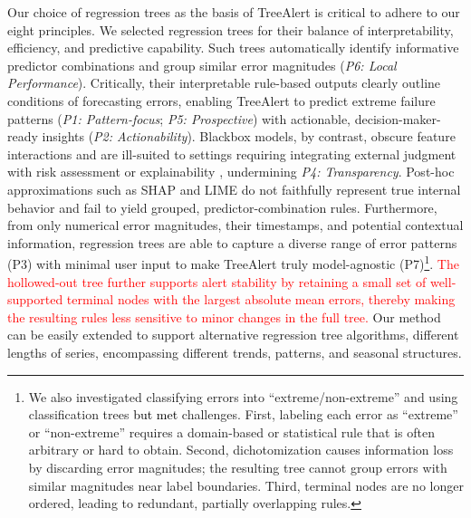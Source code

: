 \documentclass[]{interact}
\newcommand{\galit}[1]{\textcolor{black}{#1}}
\newcommand{\matt}[1]{\textcolor{red}{#1}}
\theoremstyle{definition}
\begin{document}
Our %
choice of regression trees as the basis of TreeAlert is %
critical to adhere to our eight principles. %
We selected regression trees for their balance of interpretability, efficiency, and predictive capability. Such trees automatically identify informative predictor combinations and group similar error magnitudes (\emph{P6: Local Performance}). Critically, their interpretable rule-based outputs clearly outline conditions %
of forecasting errors, %
enabling TreeAlert to predict extreme failure patterns (\emph{P1: Pattern-focus}; \emph{P5: Prospective}) with actionable, decision-maker-ready insights (\emph{P2: Actionability}). Blackbox models, by contrast, obscure feature interactions %
and are ill-suited to settings requiring integrating external judgment with risk assessment or explainability \citep{rudin2019, houssainy2021}, undermining \emph{P4: Transparency}. Post-hoc approximations such as SHAP and LIME do not faithfully represent true internal behavior \citep{rudin2019} and fail to yield grouped, predictor-combination rules. Furthermore, from only numerical error magnitudes, their timestamps, and potential contextual information, regression trees are able to capture a diverse range of error patterns (P3) with minimal user input to make TreeAlert truly model-agnostic (P7)\footnote{We also investigated classifying errors into “extreme/non-extreme” and using classification trees \galit{but met} %
challenges. First, labeling each error as “extreme” or “non-extreme” requires a domain-based or statistical rule that is often arbitrary or hard to obtain. Second, dichotomization causes information loss by discarding error magnitudes; the resulting tree cannot group errors with similar magnitudes near label boundaries. Third, terminal nodes are no longer ordered, leading to redundant, partially overlapping rules.}.
\matt{The hollowed-out tree further supports alert stability by retaining a small set of well-supported terminal nodes with the largest absolute mean errors, thereby making the resulting rules less sensitive to minor changes in the full tree.}
Our method can be easily extended to support alternative regression tree algorithms, different lengths of series, encompassing different trends, patterns, and seasonal structures.
\end{document}
